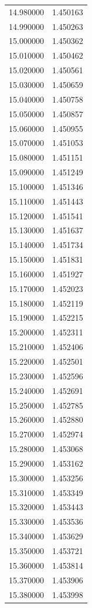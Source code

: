 \begin{tabular}{rr}
14.980000 & 1.450163 \\
14.990000 & 1.450263 \\
15.000000 & 1.450362 \\
15.010000 & 1.450462 \\
15.020000 & 1.450561 \\
15.030000 & 1.450659 \\
15.040000 & 1.450758 \\
15.050000 & 1.450857 \\
15.060000 & 1.450955 \\
15.070000 & 1.451053 \\
15.080000 & 1.451151 \\
15.090000 & 1.451249 \\
15.100000 & 1.451346 \\
15.110000 & 1.451443 \\
15.120000 & 1.451541 \\
15.130000 & 1.451637 \\
15.140000 & 1.451734 \\
15.150000 & 1.451831 \\
15.160000 & 1.451927 \\
15.170000 & 1.452023 \\
15.180000 & 1.452119 \\
15.190000 & 1.452215 \\
15.200000 & 1.452311 \\
15.210000 & 1.452406 \\
15.220000 & 1.452501 \\
15.230000 & 1.452596 \\
15.240000 & 1.452691 \\
15.250000 & 1.452785 \\
15.260000 & 1.452880 \\
15.270000 & 1.452974 \\
15.280000 & 1.453068 \\
15.290000 & 1.453162 \\
15.300000 & 1.453256 \\
15.310000 & 1.453349 \\
15.320000 & 1.453443 \\
15.330000 & 1.453536 \\
15.340000 & 1.453629 \\
15.350000 & 1.453721 \\
15.360000 & 1.453814 \\
15.370000 & 1.453906 \\
15.380000 & 1.453998 \\

\end{tabular}

